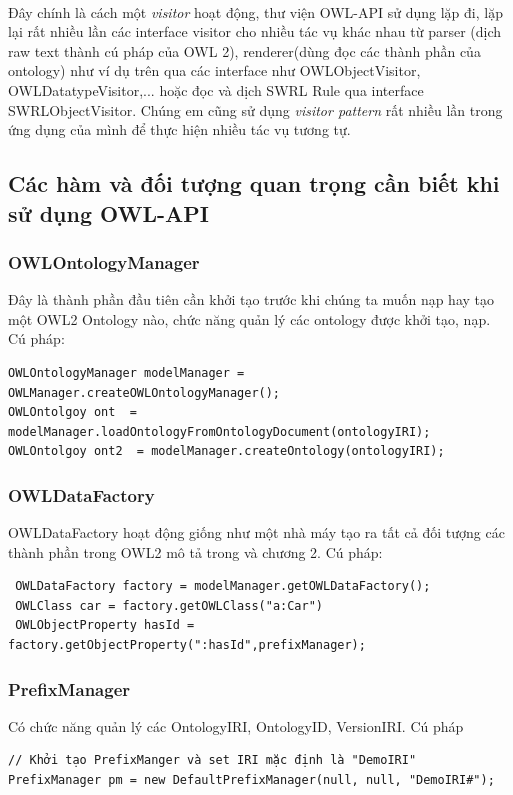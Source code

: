 \\
Đây chính là cách một \textit{visitor} hoạt động, thư viện OWL-API sử dụng lặp đi, lặp lại rất nhiều lần các interface visitor cho nhiều tác vụ khác nhau từ parser (dịch raw text thành cú pháp của OWL 2), renderer(dùng đọc các thành phần của ontology) như ví dụ trên qua các interface như OWLObjectVisitor, OWLDatatypeVisitor,... hoặc đọc và dịch SWRL Rule qua interface SWRLObjectVisitor. Chúng em cũng sử dụng \textit{visitor pattern} rất nhiều lần trong ứng dụng của mình để thực hiện nhiều tác vụ tương tự.
\subsection{Các hàm và đối tượng quan trọng cần biết khi sử dụng OWL-API}
\subsubsection{OWLOntologyManager}
Đây là thành phần đầu tiên cần khởi tạo trước khi chúng ta muốn nạp hay tạo một OWL2 Ontology nào, chức năng quản lý các ontology được khởi tạo, nạp. Cú pháp:
\begin{verbatim}
OWLOntologyManager modelManager = OWLManager.createOWLOntologyManager();
OWLOntolgoy ont  = modelManager.loadOntologyFromOntologyDocument(ontologyIRI);
OWLOntolgoy ont2  = modelManager.createOntology(ontologyIRI);
\end{verbatim}
\subsubsection{OWLDataFactory}
OWLDataFactory hoạt động giống như một nhà máy tạo ra tất cả đối tượng các thành phần trong OWL2 mô tả trong \cite{owl2spec} và chương 2. Cú pháp:
\begin{verbatim}
 OWLDataFactory factory = modelManager.getOWLDataFactory();
 OWLClass car = factory.getOWLClass("a:Car")
 OWLObjectProperty hasId = factory.getObjectProperty(":hasId",prefixManager);
\end{verbatim}
\subsubsection{PrefixManager}
Có chức năng quản lý các OntologyIRI, OntologyID, VersionIRI. Cú pháp
\begin{verbatim}
// Khởi tạo PrefixManger và set IRI mặc định là "DemoIRI"
PrefixManager pm = new DefaultPrefixManager(null, null, "DemoIRI#");
\end{verbatim}

